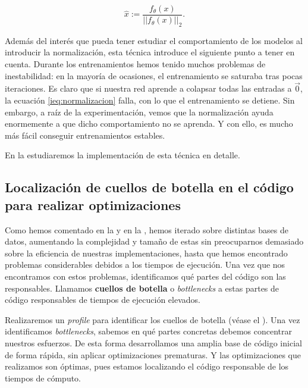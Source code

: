 \begin{equation} \label{ieq:normalizacion}
    \hat{x} := \frac{f_{\theta}(x)}{||f_{\theta}(x)||_2}.
\end{equation}

Además del interés que pueda tener estudiar el comportamiento de los modelos al introducir la normalización, esta técnica introduce el siguiente punto a tener en cuenta. Durante los entrenamientos hemos tenido muchos problemas de inestabilidad:  en la mayoría de ocasiones, el entrenamiento se saturaba tras pocas iteraciones. Es claro que si nuestra red aprende a colapsar todas las entradas a $\vec{0}$, la ecuación \eqref{ieq:normalizacion} falla, con lo que el entrenamiento se detiene. Sin embargo, a raíz de la experimentación, vemos que la normalización ayuda enormemente a que dicho comportamiento no se aprenda. Y con ello, es mucho más fácil conseguir entrenamientos estables.

En la  estudiaremos la implementación de esta técnica en detalle.

\subsection{Localización de cuellos de botella en el código para realizar optimizaciones} \label{isubs:localizacion_partes_criticas}

Como hemos comentado en la  y en la , hemos iterado sobre distintas bases de datos, aumentando la complejidad y tamaño de estas sin preocuparnos demasiado sobre la eficiencia de nuestras implementaciones, hasta que hemos encontrado problemas considerables debidos a los tiempos de ejecución. Una vez que nos encontramos con estos problemas, identificamos qué partes del código son las responsables. Llamamos \textbf{cuellos de botella} o \textit{bottlenecks} a estas partes de código responsables de tiempos de ejecución elevados.

Realizaremos un \textit{profile} para identificar los cuellos de botella (véase el ). Una vez identificamos \textit{bottlenecks}, sabemos en qué partes concretas debemos concentrar nuestros esfuerzos. De esta forma desarrollamos una amplia base de código inicial de forma rápida, sin aplicar optimizaciones prematuras. Y las optimizaciones que realizamos son óptimas, pues estamos localizando el código responsable de los tiempos de cómputo.


